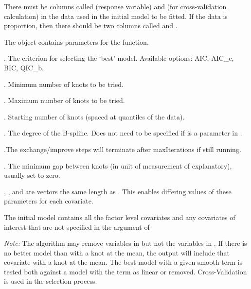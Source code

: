 \documentclass[a4paper]{book}
\begin{document}
%
\begin{Details}\relax
There must be columns called  (response variable) and  (for cross-validation calculation) in the data used in the initial model to be fitted. If the data is proportion, then there should be two columns called  and .

The object  contains parameters for the  function.

. The criterion for selecting the `best' model.  Available options: AIC, AIC\_c, BIC, QIC\_b.

. Minimum number of knots to be tried.

. Maximum number of knots to be tried.

. Starting number of knots (spaced at quantiles of the data).

. The degree of the B-spline. Does not need to be specified if  is a parameter in .

.The exchange/improve steps will terminate after maxIterations if still running.

. The minimum gap between knots (in unit of measurement of explanatory), usually set to zero.


, ,  and  are vectors the same length as .  This enables differing values of these parameters for each covariate.

The initial model contains all the factor level covariates and any covariates of interest that are not specified in the  argument of  

\emph{Note:} The algorithm may remove variables in  but not the variables in .  If there is no better model than with a knot at the mean, the output will include that covariate with a knot at the mean.  The best model with a given smooth term is tested both against a model with the term as linear or removed. Cross-Validation is used in the selection process.
\end{Details}
%
\end{document}
